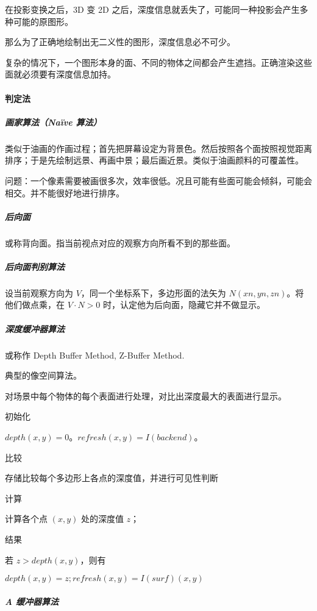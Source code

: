 \documentclass[
]{article}
\begin{document}
在投影变换之后，3D 变 2D
之后，深度信息就丢失了，可能同一种投影会产生多种可能的原图形。

那么为了正确地绘制出无二义性的图形，深度信息必不可少。

复杂的情况下，一个图形本身的面、不同的物体之间都会产生遮挡。正确渲染这些面就必须要有深度信息加持。

\hypertarget{header-n97}{%
\paragraph{判定法}\label{header-n97}}

\hypertarget{header-n98}{%
\subparagraph{画家算法（Naïve 算法）}\label{header-n98}}

类似于油画的作画过程；首先把屏幕设定为背景色。然后按照各个面按照视觉距离排序；于是先绘制远景、再画中景；最后画近景。类似于油画颜料的可覆盖性。

问题：一个像素需要被画很多次，效率很低。况且可能有些面可能会倾斜，可能会相交。并不能很好地进行排序。

\hypertarget{header-n101}{%
\subparagraph{后向面}\label{header-n101}}

或称背向面。指当前视点对应的观察方向所看不到的那些面。

\hypertarget{header-n103}{%
\subparagraph{后向面判别算法}\label{header-n103}}

设当前观察方向为 \(V\)，同一个坐标系下，多边形面的法矢为
\(N(xn, yn, zn)\)。将他们做点乘，在 \(V·N>0\)
时，认定他为后向面，隐藏它并不做显示。

\hypertarget{header-n105}{%
\subparagraph{深度缓冲器算法}\label{header-n105}}

或称作 Depth Buffer Method, Z-Buffer Method.

典型的像空间算法。

对场景中每个物体的每个表面进行处理，对比出深度最大的表面进行显示。

初始化

\(depth(x, y) = 0\)。\(refresh(x, y) = I(backend)\)。

比较

存储比较每个多边形上各点的深度值，并进行可见性判断

计算

计算各个点 \((x, y)\) 处的深度值 \(z\)；

结果

若 \(z > depth(x, y)\)，则有

\(depth(x, y) = z; refresh(x, y) = I(surf)(x, y)\)

\hypertarget{header-n118}{%
\subparagraph{A 缓冲器算法}\label{header-n118}}
\end{document}
